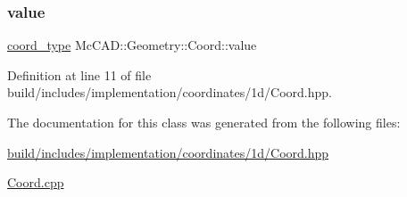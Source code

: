 \subsubsection{\texorpdfstring{value}{value}}
{\footnotesize\ttfamily \hyperlink{namespaceMcCAD_1_1Geometry_ac043b37a4a7e849fca22869e1982d2f8}{coord\+\_\+type} Mc\+C\+A\+D\+::\+Geometry\+::\+Coord\+::value}



Definition at line 11 of file build/includes/implementation/coordinates/1d/\+Coord.\+hpp.



The documentation for this class was generated from the following files\+:\begin{DoxyCompactItemize}
\item 
\hyperlink{build_2includes_2implementation_2coordinates_21d_2Coord_8hpp}{build/includes/implementation/coordinates/1d/\+Coord.\+hpp}\item 
\hyperlink{Coord_8cpp}{Coord.\+cpp}\end{DoxyCompactItemize}
